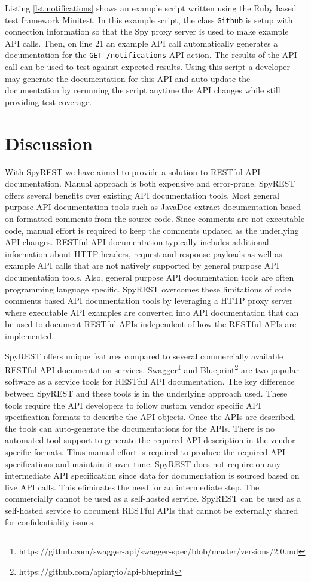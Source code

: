 \documentclass[conference]{IEEEtran}
\begin{document}
Listing \ref{lst:notifications} shows an example script written using the Ruby based test framework Minitest. In this example script, the class \texttt{Github} is setup with connection information so that the Spy proxy server is used to make example API calls. Then, on line 21 an example API call automatically generates a documentation for the \texttt{GET /notifications} API action. The results of the API call can be used to test against expected results. Using this script a developer may generate the documentation for this API and auto-update the documentation by rerunning the script anytime the API changes while still providing test coverage.

\section{Discussion}
With SpyREST we have aimed to provide a solution to RESTful API documentation. Manual approach is both expensive and error-prone. SpyREST offers several benefits over existing API documentation tools. Most general purpose API documentation tools such as JavaDoc extract documentation based on formatted comments from the source code. Since comments are not executable code, manual effort is required to keep the comments updated as the underlying API changes. RESTful API documentation typically includes additional information about HTTP headers, request and response payloads as well as example API calls that are not natively supported by general purpose API documentation tools. Also, general purpose API documentation tools are often programming language specific. SpyREST overcomes these limitations of code comments based API documentation tools by leveraging a HTTP proxy server where executable API examples are converted into API documentation that can be used to document RESTful APIs independent of how the RESTful APIs are implemented.

SpyREST offers unique features compared to several commercially available RESTful API documentation services. Swagger\footnote{https://github.com/swagger-api/swagger-spec/blob/master/versions/2.0.md} and Blueprint\footnote{https://github.com/apiaryio/api-blueprint} are two popular software as a service tools for RESTful API documentation. The key difference between SpyREST and these tools is in the underlying approach used. These tools require the API developers to follow custom vendor specific API specification formats to describe the API objects. Once the APIs are described, the tools can auto-generate the documentations for the APIs. There is no automated tool support to generate the required API description in the vendor specific formats. Thus manual effort is required to produce the required API specifications and maintain it over time. SpyREST does not require on any intermediate API specification since data for documentation is sourced based on live API calls. This eliminates the need for an intermediate step. The commercially cannot be used as a self-hosted service. SpyREST can be used as a self-hosted service to document RESTful APIs that cannot be externally shared for confidentiality issues.
\end{document}
